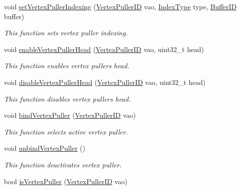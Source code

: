 \begin{DoxyCompactItemize}
void \hyperlink{group__vertexpuller__tasks_gae5238dbc60eb2ece94df110945a4f46b}{set\+Vertex\+Puller\+Indexing} (\hyperlink{fwd_8hpp_af6f78f73099477c9ce5537d657597486}{Vertex\+Puller\+ID} vao, \hyperlink{fwd_8hpp_a2bfb0a0ff1c379a8b4e8f9d24fdd4839}{Index\+Type} type, \hyperlink{fwd_8hpp_a5114031b77b80ad895eff688720b7f93}{Buffer\+ID} buffer)
\begin{DoxyCompactList}\small\item\em This function sets vertex puller indexing. \end{DoxyCompactList}\item 
void \hyperlink{group__vertexpuller__tasks_ga61384d99754bda4d91790c49b1639b30}{enable\+Vertex\+Puller\+Head} (\hyperlink{fwd_8hpp_af6f78f73099477c9ce5537d657597486}{Vertex\+Puller\+ID} vao, uint32\+\_\+t head)
\begin{DoxyCompactList}\small\item\em This function enables vertex puller\textquotesingle{}s head. \end{DoxyCompactList}\item 
void \hyperlink{group__vertexpuller__tasks_gae95cab56d80cb888e71b25965dc868c5}{disable\+Vertex\+Puller\+Head} (\hyperlink{fwd_8hpp_af6f78f73099477c9ce5537d657597486}{Vertex\+Puller\+ID} vao, uint32\+\_\+t head)
\begin{DoxyCompactList}\small\item\em This function disables vertex puller\textquotesingle{}s head. \end{DoxyCompactList}\item 
void \hyperlink{group__vertexpuller__tasks_gac7f9799e1a6a3b1cafb5f4c4c5e9555d}{bind\+Vertex\+Puller} (\hyperlink{fwd_8hpp_af6f78f73099477c9ce5537d657597486}{Vertex\+Puller\+ID} vao)
\begin{DoxyCompactList}\small\item\em This function selects active vertex puller. \end{DoxyCompactList}\item 
void \hyperlink{group__vertexpuller__tasks_gafdfb7e3cd24d595af6650b68ba9f6f24}{unbind\+Vertex\+Puller} ()
\begin{DoxyCompactList}\small\item\em This function deactivates vertex puller. \end{DoxyCompactList}\item 
bool \hyperlink{group__vertexpuller__tasks_ga09408b5ca4250292217f3330ae674319}{is\+Vertex\+Puller} (\hyperlink{fwd_8hpp_af6f78f73099477c9ce5537d657597486}{Vertex\+Puller\+ID} vao)

\end{DoxyCompactItemize}
